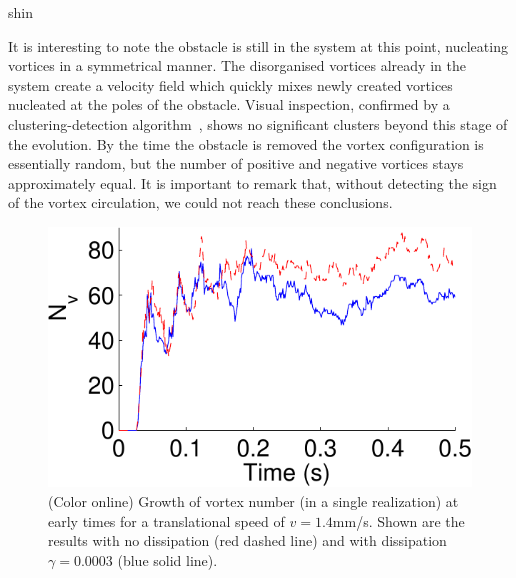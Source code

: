 \begin{chapter}{\label{cha:shin}shin}

It is interesting to note the obstacle is still in the system 
at this point, nucleating vortices in a symmetrical manner. 
The disorganised vortices already in the system create a velocity 
field which quickly mixes newly created vortices nucleated at the
poles of the obstacle. Visual inspection, confirmed by a 
clustering-detection algorithm~\citep{white_barenghi_12,reeves_billam_13}, 
shows no significant clusters beyond this stage of the evolution. 
By the time the obstacle is removed the vortex configuration is 
essentially random, but 
the number of positive and negative vortices stays approximately equal.
It is important to remark that, without detecting the sign of the vortex circulation, we
could not reach these conclusions.


\begin{figure}
\includegraphics[width=0.7\linewidth]{shin/fig3}
\caption{\label{fig:N_vTime} (Color online) Growth of vortex number (in a single realization) at early times for a translational speed of $v=1.4$mm/s. Shown are the results with no dissipation (red dashed line) and with dissipation $\gamma=0.0003$ (blue solid line).
}
\end{figure}

\end{chapter}
